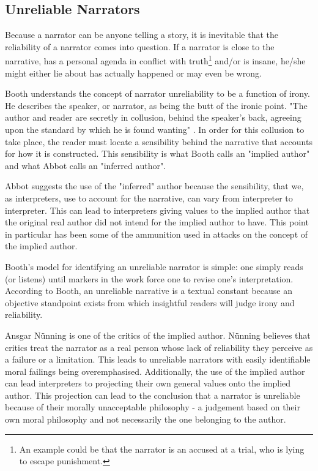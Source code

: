 \subsection{Unreliable Narrators}
Because a narrator can be anyone telling a story, it is inevitable that the reliability of a narrator comes into question. If a narrator is close to the narrative, has a personal agenda in conflict with truth\footnote{An example could be that the narrator is an accused at a trial, who is lying to escape punishment.} and/or is insane, he/she might either lie about has actually happened or may even be wrong. 

Booth understands the concept of narrator unreliability to be a function of irony. He describes the speaker, or narrator, as being the butt of the ironic point. "The author and reader are secretly in collusion, behind the speaker's back, agreeing upon the standard by which he is found wanting" \cite[p. 94]{Olson}. In order for this collusion to take place, the reader must locate a sensibility behind the narrative that accounts for how it is constructed. This sensibility is what Booth calls an "implied author" \cite[p. 94]{Olson} and what Abbot calls an "inferred author"\cite[p. 84-85]{Abbot}.

Abbot suggests the use of the "inferred" author because the sensibility, that we, as interpreters, use to account for the narrative, can vary from interpreter to interpreter. This can lead to interpreters giving values to the implied author that the original real author did not intend for the implied author to have. This point in particular has been some of the ammunition used in attacks on the concept of the implied author.\cite[p.85]{Abbot}

Booth's model for identifying an unreliable narrator is simple: one simply reads (or listens) until markers in the work force one to revise one's interpretation. According to Booth, an unreliable narrative is a textual constant because an objective standpoint exists from which insightful readers will judge irony and reliability.\cite[p. 95]{Olson}

Ansgar N\"unning is one of the critics of the implied author. N\"unning believes that critics treat the narrator as a real person whose lack of reliability they perceive as a failure or a limitation. This leads to unreliable narrators with easily identifiable moral failings being overemphasised. Additionally, the use of the implied author can lead interpreters to projecting their own general values onto the implied author. This projection can lead to the conclusion that a narrator is unreliable because of their morally unacceptable philosophy - a judgement based on their own moral philosophy and not necessarily the one belonging to the author. \cite[p. 96-97]{Olson} 



